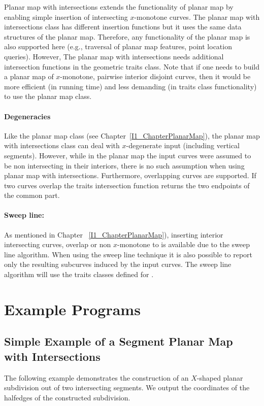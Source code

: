 Planar map with intersections extends the functionality of planar
map by enabling simple insertion of intersecting $x$-monotone
curves. The planar map with intersections class has different
insertion functions but it uses the same data structures of the
planar map. Therefore, any functionality of the planar map is also
supported here (e.g., traversal of planar map features, point
location queries). However, The planar map with intersections
needs additional intersection functions in the geometric traits
class. Note that if one needs to build a planar map of
$x$-monotone, pairwise interior disjoint curves, then it would be
more efficient (in running time) and less demanding (in traits
class functionality) to use the planar map class.


\paragraph{Degeneracies} Like the planar map class (see
Chapter~\ref{I1_ChapterPlanarMap}), the planar map with intersections class can deal with
$x$-degenerate input (including vertical segments). However, while in the
planar map the input curves were assumed to be non
intersecting in their interiors, there is no such assumption when using
planar map with intersections. Furthermore, overlapping curves are
supported. If two curves overlap the traits intersection function returns
the two endpoints of the common part.

\paragraph{Sweep line:}
As mentioned in Chapter ~\ref{I1_ChapterPlanarMap}), 
inserting interior intersecting curves, overlap or non $x$-monotone to  
is available due to the sweep line algorithm.
When using the sweep line technique it is also possible to report only 
the resulting subcurves induced by the input curves.
The sweep line algorithm will use the traits classes defined for . 




\section{Example Programs}
\subsection{Simple Example of a Segment Planar Map with Intersections}
\label{ssec:example1}
The following example demonstrates the construction of an
$X$-shaped planar subdivision out of two intersecting segments.
We output the coordinates of the halfedges of the constructed
subdivision.

